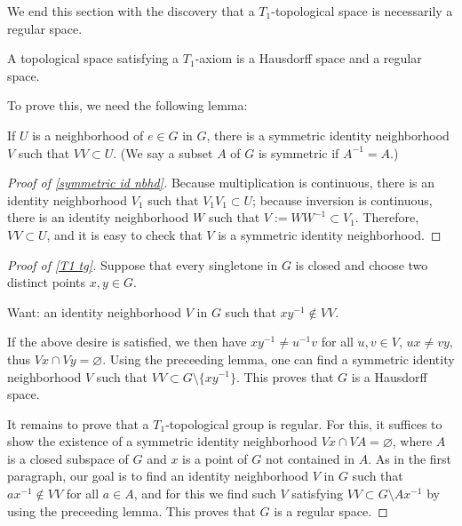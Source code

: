 We end this section with the discovery that a $T_1$-topological space is necessarily a regular space.
\begin{thm}\label{T1 tg}
    A topological space satisfying a $T_1$-axiom is a Hausdorff space and a regular space.
\end{thm}
To prove this, we need the following lemma:
\begin{lem}\label{symmetric id nbhd}
    If $U$ is a neighborhood of $e\in G$ in $G$, there is a symmetric identity neighborhood $V$ such that $VV\subset U$.
    (We say a subset $A$ of $G$ is symmetric if $A^{-1}=A$.)
\end{lem}
\begin{proof}[Proof of \cref{symmetric id nbhd}]
    Because multiplication is continuous, there is an identity neighborhood $V_1$ such that $V_1V_1\subset U$; because inversion is continuous, there is an identity neighborhood $W$ such that $V:=WW^{-1}\subset V_1$.
    Therefore, $VV\subset U$, and it is easy to check that $V$ is a symmetric identity neighborhood.
\end{proof}
\begin{proof}[Proof of \cref{T1 tg}]
    Suppose that every singletone in $G$ is closed and choose two distinct points $x, y\in G$.
    \begin{center}
        Want: an identity neighborhood $V$ in $G$ such that $xy^{-1}\notin VV$.
    \end{center}
    If the above desire is satisfied, we then have $xy^{-1}\neq u^{-1}v$ for all $u, v\in V$, $ux\neq vy$, thus $Vx\cap Vy=\varnothing$.
    Using the preceeding lemma, one can find a symmetric identity neighborhood $V$ such that $VV\subset G\setminus\{xy^{-1}\}$.
    This proves that $G$ is a Hausdorff space.

    It remains to prove that a $T_1$-topological group is regular.
    For this, it suffices to show the existence of a symmetric identity neighborhood $Vx\cap VA=\varnothing$, where $A$ is a closed subspace of $G$ and $x$ is a point of $G$ not contained in $A$.
    As in the first paragraph, our goal is to find an identity neighborhood $V$ in $G$ such that $ax^{-1}\notin VV$ for all $a\in A$, and for this we find such $V$ satisfying $VV\subset G\setminus Ax^{-1}$ by using the preceeding lemma.
    This proves that $G$ is a regular space.
\end{proof}
